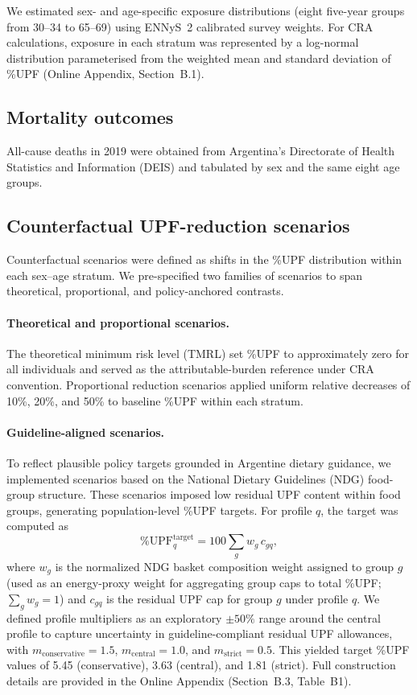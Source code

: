 ﻿\documentclass{article}
\begin{document}
We estimated sex- and age-specific exposure distributions (eight five-year groups from 30--34 to 65--69) using ENNyS~2 calibrated survey weights. For CRA calculations, exposure in each stratum was represented by a log-normal distribution parameterised from the weighted mean and standard deviation of \%UPF (Online Appendix, Section~B.1).

\subsection{Mortality outcomes}

All-cause deaths in 2019 were obtained from Argentina's Directorate of Health Statistics and Information (DEIS)\cite{DEIS2019} and tabulated by sex and the same eight age groups.

\subsection{Counterfactual UPF-reduction scenarios}

Counterfactual scenarios were defined as shifts in the \%UPF distribution within each sex--age stratum. We pre-specified two families of scenarios to span theoretical, proportional, and policy-anchored contrasts.

\paragraph{Theoretical and proportional scenarios.}
The theoretical minimum risk level (TMRL) set \%UPF to approximately zero for all individuals and served as the attributable-burden reference under CRA convention. Proportional reduction scenarios applied uniform relative decreases of 10\%, 20\%, and 50\% to baseline \%UPF within each stratum.

\paragraph{Guideline-aligned scenarios.}
To reflect plausible policy targets grounded in Argentine dietary guidance, we implemented scenarios based on the National Dietary Guidelines (NDG) food-group structure.\cite{NDG2016} These scenarios imposed low residual UPF content within food groups, generating population-level \%UPF targets. For profile $q$, the target was computed as
%
\begin{equation}
\%\mathrm{UPF}^{\mathrm{target}}_q = 100\sum_g w_g\,c_{gq},
\end{equation}
%
where $w_g$ is the normalized NDG basket composition weight assigned to group $g$ (used as an energy-proxy weight for aggregating group caps to total \%UPF; $\sum_g w_g=1$) and $c_{gq}$ is the residual UPF cap for group $g$ under profile $q$. We defined profile multipliers as an exploratory $\pm50\%$ range around the central profile to capture uncertainty in guideline-compliant residual UPF allowances, with $m_{\text{conservative}}=1.5$, $m_{\text{central}}=1.0$, and $m_{\text{strict}}=0.5$. This yielded target \%UPF values of 5.45 (conservative), 3.63 (central), and 1.81 (strict). Full construction details are provided in the Online Appendix (Section~B.3, Table~B1).
\end{document}
